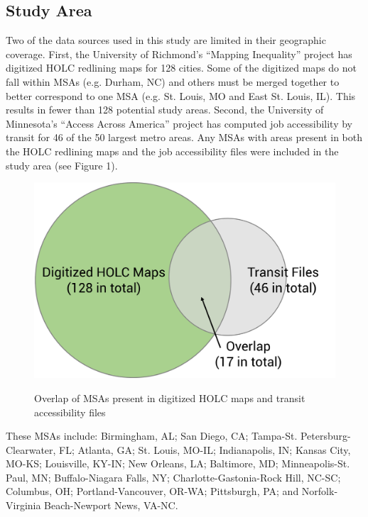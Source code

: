 \documentclass[paper=letter, fontsize=12pt]{scrartcl} %
\begin{document}
\subsection{Study Area}
Two of the data sources used in this study are limited in their geographic coverage. First, the University of Richmond's ``Mapping Inequality'' project has digitized HOLC redlining maps for 128 cities. Some of the digitized maps do not fall within MSAs (e.g. Durham, NC) and others must be merged together to better correspond to one MSA (e.g. St. Louis, MO and East St. Louis, IL). This results in fewer than 128 potential study areas. Second, the University of Minnesota's ``Access Across America'' project has computed job accessibility by transit for 46 of the 50 largest metro areas. Any MSAs with areas present in both the HOLC redlining maps and the job accessibility files were included in the study area (see Figure 1).\par
\begin{figure}[h]
	\centering
	\includegraphics[width = 4.5in]{StudyAreaSelection}\\
	\caption{Overlap of MSAs present in digitized HOLC maps and transit accessibility files}
\end{figure}
These MSAs include: Birmingham, AL; San Diego, CA; Tampa-St. Petersburg-Clearwater, FL; Atlanta, GA; St. Louis, MO-IL; Indianapolis, IN; Kansas City, MO-KS; Louisville, KY-IN; New Orleans, LA; Baltimore, MD; Minneapolis-St. Paul, MN; Buffalo-Niagara Falls, NY; Charlotte-Gastonia-Rock Hill, NC-SC; Columbus, OH; Portland-Vancouver, OR-WA; Pittsburgh, PA; and Norfolk-Virginia Beach-Newport News, VA-NC.
\end{document}

